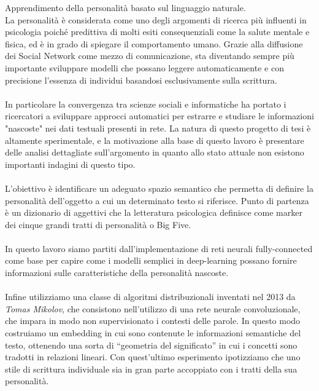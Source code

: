 Apprendimento  della personalità basato sul linguaggio naturale. \\


La personalità è considerata come uno degli argomenti di ricerca più influenti in psicologia poiché predittiva di molti esiti consequenziali come la salute mentale e fisica, ed è in grado di spiegare il comportamento umano.
Grazie alla diffusione dei Social Network come mezzo di comunicazione, sta diventando sempre più importante sviluppare modelli che possano leggere automaticamente e con precisione l'essenza di individui basandosi esclusivamente sulla scrittura. 
\\\\
In particolare la convergenza tra scienze sociali e informatiche ha portato i ricercatori a sviluppare approcci automatici per estrarre e studiare le informazioni "nascoste" nei dati testuali presenti in rete.
La natura di questo progetto di tesi è altamente sperimentale, e la motivazione alla base di questo lavoro è presentare delle analisi dettagliate sull'argomento in quanto allo stato attuale non esistono importanti indagini di questo tipo.
\\\\
L'obiettivo è identificare un adeguato spazio semantico che permetta di definire la personalità dell'oggetto a cui un determinato testo si riferisce. Punto di partenza è un dizionario di aggettivi che la letteratura psicologica definisce come marker dei cinque grandi tratti di personalità o Big Five.
\\\\
In questo lavoro siamo partiti dall'implementazione di reti neurali  fully-connected come base per capire come i modelli semplici in deep-learning possano fornire informazioni sulle caratteristiche della personalità nascoste. 
\\\\
Infine utilizziamo una classe di algoritmi distribuzionali inventati nel 2013 da \emph{Tomas Mikolov}, che consistono nell'utilizzo di una rete neurale convoluzionale, che impara in modo non supervisionato i contesti delle parole.
In questo modo costruiamo un embedding in cui sono contenute le informazioni semantiche del testo, ottenendo una sorta di “geometria del significato” in cui i concetti sono tradotti in relazioni lineari.
Con quest'ultimo esperimento ipotizziamo che uno stile di scrittura individuale sia in gran parte accoppiato con i tratti della sua personalità.



